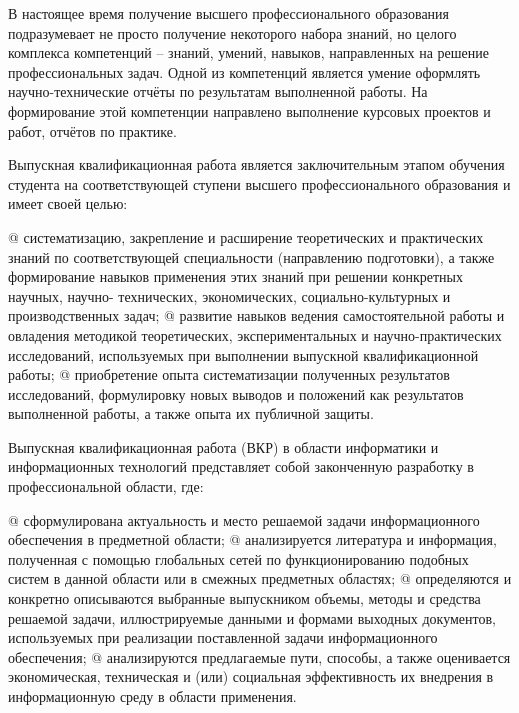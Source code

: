 
\usepackage{mdframed}




\tableofcontents


В настоящее время получение высшего профессионального образования подразумевает
не просто получение некоторого набора знаний, но целого комплекса компетенций – знаний,
умений, навыков, направленных на решение профессиональных задач. Одной из компетенций
является умение оформлять научно-технические отчёты по результатам выполненной работы.
На формирование этой компетенции направлено выполнение курсовых проектов и работ,
отчётов по практике.

Выпускная квалификационная работа является заключительным этапом обучения
студента на соответствующей ступени высшего профессионального образования и имеет своей
целью:
\begin{easylist}\NewList\bullist
	@ систематизацию, закрепление и расширение теоретических и практических знаний по
	соответствующей специальности (направлению подготовки), а также формирование
	навыков применения этих знаний при решении конкретных научных, научно-
	технических, экономических, социально-культурных и производственных задач;
	@ развитие навыков ведения самостоятельной работы и овладения методикой
	теоретических, экспериментальных и научно-практических исследований,
	используемых при выполнении выпускной квалификационной работы;
	@ приобретение опыта систематизации полученных результатов исследований,
	формулировку новых выводов и положений как результатов выполненной работы, а
	также опыта их публичной защиты.
\end{easylist}

Выпускная квалификационная работа (ВКР) в области информатики и информационных
технологий представляет собой законченную разработку в профессиональной области, где:

\begin{easylist} \bullist
	@ сформулирована актуальность и место решаемой задачи информационного обеспечения 
	в предметной области;
	@ анализируется литература и информация, полученная с помощью глобальных сетей
	по функционированию подобных систем в данной области или в смежных
	предметных областях;
	@ определяются и конкретно описываются выбранные выпускником объемы, методы и
	средства решаемой задачи, иллюстрируемые данными и формами выходных
	документов, используемых при реализации поставленной задачи информационного
	обеспечения;
	@ анализируются предлагаемые пути, способы, а также оценивается экономическая,
	техническая и (или) социальная эффективность их внедрения в информационную
	среду в области применения.
\end{easylist}

